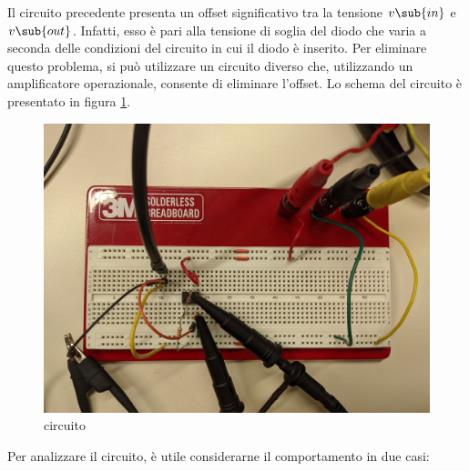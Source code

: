 Il circuito precedente presenta un offset significativo tra la tensione $v\sub{in}$ e $v\sub{out}$. Infatti, esso è pari alla tensione di soglia del diodo che varia a seconda delle condizioni del circuito in cui il diodo è inserito. Per eliminare questo problema, si può utilizzare un circuito diverso che, utilizzando un amplificatore operazionale, consente di eliminare l'offset. Lo schema del circuito è presentato in figura \ref{fig:circuito_2}.
\begin{figure}[ht!]
	\centering
	\begin{minipage}{.45\textwidth}
	\end{minipage}\qquad
	\begin{minipage}{.48\textwidth}
		\includegraphics[width=\linewidth]{./ImageFiles/Laboratorio 2/CIR2.jpg}
	\end{minipage}
	\caption{circuito}
	\label{fig:circuito_2}
\end{figure}
Per analizzare il circuito, è utile considerarne il comportamento in due casi:

